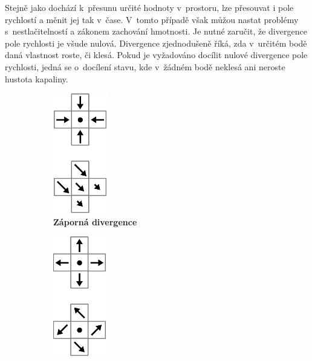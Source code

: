 Stejně jako dochází k~přesunu určité hodnoty v~prostoru, lze přesouvat i pole rychlostí a měnit jej tak v~čase. V~tomto případě však můžou nastat problémy s~nestlačitelností a zákonem zachování hmotnosti. Je nutné zaručit, že divergence pole rychlosti je všude nulová. Divergence zjednodušeně říká, zda v~určitém bodě daná vlastnost roste, či klesá. Pokud je vyžadováno docílit nulové divergence pole rychlosti, jedná se o~docílení stavu, kde v~žádném bodě neklesá ani neroste hustota kapaliny. \cite{webglFluid}

\begin{figure}[h]
	\captionsetup{justification=centering}
	\centering
	\begin{subfigure}{.3\textwidth}
		\centering
		\includegraphics[width=0.35\linewidth]{obrazky-figures/div-negative.png}
		\caption{\textbf{Záporná divergence}}
		\label{fig:divPlus}
	\end{subfigure}%
	\begin{subfigure}{.3\textwidth}
		\centering
		\includegraphics[width=0.35\linewidth]{obrazky-figures/div-positive.png}

\end{subfigure}
\end{figure}
